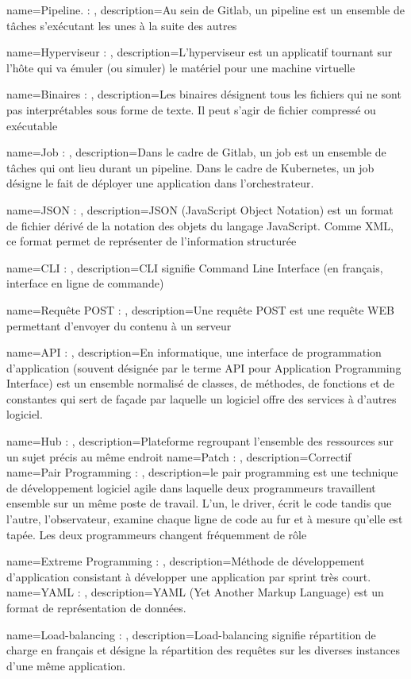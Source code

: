 {
    name=Pipeline. : ,
    description={Au sein de Gitlab, un pipeline est un ensemble de tâches s'exécutant les unes à la suite des autres}
}


{
    name=Hyperviseur : ,
    description={L’hyperviseur est un applicatif tournant sur l’hôte qui va émuler (ou simuler) le matériel pour une machine virtuelle}
}

{
    name=Binaires : ,
    description={Les binaires désignent tous les fichiers qui ne sont pas interprétables sous forme de texte. Il peut s'agir de fichier compressé ou exécutable}
}

{
    name=Job : ,
    description={Dans le cadre de Gitlab, un job est un ensemble de tâches qui ont lieu durant un pipeline. Dans le cadre de Kubernetes, un job désigne le fait de déployer une application dans l'orchestrateur.}
}

{
    name=JSON : ,
    description={JSON (JavaScript Object Notation) est un format de fichier dérivé de la notation des objets du langage JavaScript. Comme XML, ce format permet de représenter de l’information structurée}
}

{
    name=CLI : ,
    description={CLI signifie Command Line Interface (en français, interface en ligne de commande)}
}

{
    name=Requête POST : ,
    description={Une requête POST est une requête WEB permettant d'envoyer du contenu à un serveur}
}

{
    name=API : ,
    description={En informatique, une interface de programmation d’application (souvent désignée par le terme API pour Application Programming Interface) est un ensemble normalisé de classes, de méthodes, de fonctions et de constantes qui sert de façade par laquelle un logiciel offre des services à d'autres logiciel.}
}

{
    name=Hub : ,
    description={Plateforme regroupant l’ensemble des ressources sur un sujet précis au même endroit}
}
{
    name=Patch : ,
    description={Correctif}
}
{
    name=Pair Programming : ,
    description={le pair programming est une technique de développement logiciel agile dans laquelle deux programmeurs travaillent ensemble sur un même poste de travail. L’un, le driver, écrit le code tandis que l’autre, l’observateur, examine chaque ligne de code au fur et à mesure qu’elle est tapée. Les deux programmeurs changent fréquemment de rôle}
}

{
    name=Extreme Programming : ,
    description={Méthode de développement d'application consistant à développer une application par sprint très court.}
}
{
    name=YAML : ,
    description={YAML (Yet Another Markup Language) est un format de représentation de données.}
}

{
    name=Load-balancing : ,
    description={Load-balancing signifie répartition de charge en français et désigne la répartition des requêtes sur les diverses instances d'une même application.}
}

